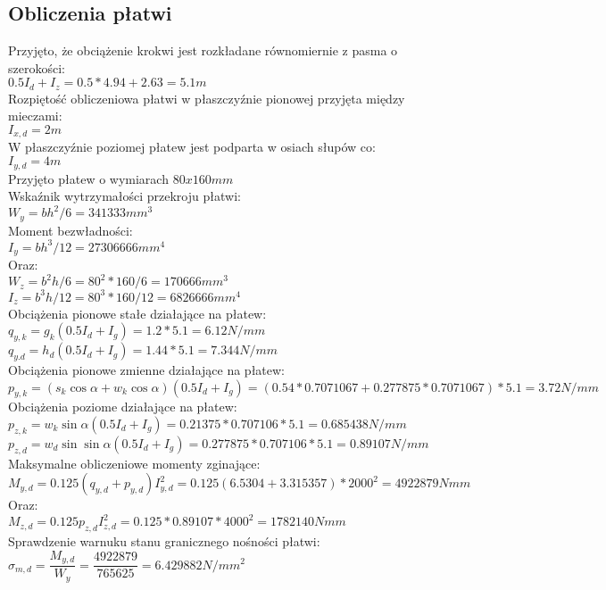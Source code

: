 \documentclass[12pt,a4paper]{article}
\begin{document}
\subsection{Obliczenia płatwi}
Przyjęto, że obciążenie krokwi jest rozkładane równomiernie z pasma o szerokości:\\
$0.5I_d+I_z = 0.5 * 4.94+2.63 = 5.1m$\\
Rozpiętość obliczeniowa płatwi w płaszczyźnie pionowej przyjęta między mieczami:\\
$I_{x,d}=2m$\\
W płaszczyźnie poziomej płatew jest podparta w osiach słupów co:\\
$I_{y,d}=4m$\\
Przyjęto płatew o wymiarach $80x160mm$\\
Wskaźnik wytrzymałości przekroju płatwi:\\
$W_y=bh^2/6=341333mm^3$\\
Moment bezwładności:\\
$I_y=bh^3/12 = 27306666mm^4$\\
Oraz:\\
$W_z=b^2h/6=80^2*160/6=170666mm^3$\\
$I_z=b^3h/12=80^3*160/12=6826666mm^4$\\
Obciążenia pionowe stałe działające na płatew:\\
$q_{y,k} = g_k(0.5I_d+I_g)=1.2*5.1=6.12N/mm$\\
$q_{y.d} = h_d(0.5I_d+I_g)=1.44*5.1=7.344N/mm$\\
Obciążenia pionowe zmienne działające na płatew:\\
$p_{y,k}=(s_k\cos\alpha+w_k\cos\alpha)(0.5I_d+I_g)=(0.54*0.7071067+0.277875*0.7071067)*5.1 = 3.72N/mm$\\
Obciążenia poziome działające na płatew:\\
$p_{z,k}=w_k\sin\alpha(0.5I_d+I_g) = 0.21375*0.707106*5.1=0.685438N/mm$\\
$p_{z,d}=w_d\sin\sin\alpha(0.5I_d+I_g)=0.277875*0.707106*5.1=0.89107N/mm$\\
Maksymalne obliczeniowe momenty zginające:\\
$M_{y,d}=0.125(q_{y,d}+p_{y,d})I_{y,d}^2=0.125(6.5304+3.315357)*2000^2=4922879Nmm$\\
Oraz:\\
$M_{z,d}=0.125p_{z,d}I_{z,d}^2=0.125*0.89107*4000^2 = 1782140Nmm$\\
Sprawdzenie warnuku stanu granicznego nośności płatwi:\\
$\sigma_{m,d}=\dfrac{M_{y,d}}{W_y}=\dfrac{4922879}{765625}=6.429882N/mm^2$\\
\end{document}
